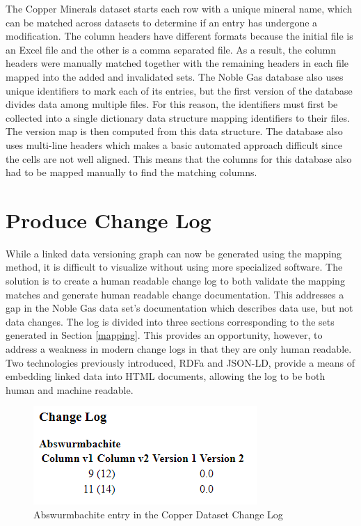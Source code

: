 The Copper Minerals dataset starts each row with a unique mineral name, which can be matched across datasets to determine if an entry has undergone a modification.
The column headers have different formats because the initial file is an Excel file and the other is a comma separated file.
As a result, the column headers were manually matched together with the remaining headers in each file mapped into the added and invalidated sets.
The Noble Gas database also uses unique identifiers to mark each of its entries, but the first version of the database divides data among multiple files.
For this reason, the identifiers must first be collected into a single dictionary data structure mapping identifiers to their files.
The version map is then computed from this data structure.
The database also uses multi-line headers which makes a basic automated approach difficult since the cells are not well aligned.
This means that the columns for this database also had to be mapped manually to find the matching columns.

\section{Produce Change Log}

While a linked data versioning graph can now be generated using the mapping method, it is difficult to visualize without using more specialized software.
The solution is to create a human readable change log to both validate the mapping matches and generate human readable change documentation.
This addresses a gap in the Noble Gas data set's documentation which describes data use, but not data changes.
The log is divided into three sections corresponding to the sets generated in Section \ref{mapping}.
This provides an opportunity, however, to address a weakness in modern change logs in that they are only human readable.
Two technologies previously introduced, RDFa and JSON-LD, provide a means of embedding linked data into HTML documents, allowing the log to be both human and machine readable.

\begin{figure}
	\centering
	\includegraphics[scale=0.80]{figures/Changelog-zoomed.png}
	\caption{Abswurmbachite entry in the Copper Dataset Change Log}
	\label{changelog_zoomed}
\end{figure}

